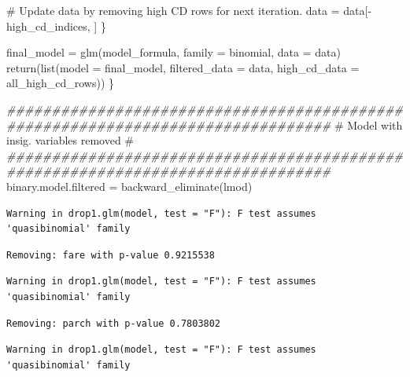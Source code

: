 \documentclass[
  letterpaper,
  DIV=11,
  numbers=noendperiod]{scrartcl}
\newenvironment{Shaded}{\begin{snugshade}}{\end{snugshade}}
\newcommand{\AttributeTok}[1]{\textcolor[rgb]{0.40,0.45,0.13}{#1}}
\newcommand{\CommentTok}[1]{\textcolor[rgb]{0.37,0.37,0.37}{#1}}
\newcommand{\DocumentationTok}[1]{\textcolor[rgb]{0.37,0.37,0.37}{\textit{#1}}}
\newcommand{\FunctionTok}[1]{\textcolor[rgb]{0.28,0.35,0.67}{#1}}
\newcommand{\NormalTok}[1]{\textcolor[rgb]{0.00,0.23,0.31}{#1}}
\newcommand{\OtherTok}[1]{\textcolor[rgb]{0.00,0.23,0.31}{#1}}
\newcommand{\SpecialCharTok}[1]{\textcolor[rgb]{0.37,0.37,0.37}{#1}}
\begin{document}
\begin{Shaded}
\begin{Highlighting}[]
    \CommentTok{\# Update data by removing high CD rows for next iteration.}
\NormalTok{    data }\OtherTok{=}\NormalTok{ data[}\SpecialCharTok{{-}}\NormalTok{high\_cd\_indices, ]}
\NormalTok{  \}}
  
\NormalTok{  final\_model }\OtherTok{=} \FunctionTok{glm}\NormalTok{(model\_formula, }\AttributeTok{family =}\NormalTok{ binomial, }\AttributeTok{data =}\NormalTok{ data)}
  \FunctionTok{return}\NormalTok{(}\FunctionTok{list}\NormalTok{(}\AttributeTok{model =}\NormalTok{ final\_model, }\AttributeTok{filtered\_data =}\NormalTok{ data, }\AttributeTok{high\_cd\_data =}\NormalTok{ all\_high\_cd\_rows))}
\NormalTok{\}}
\end{Highlighting}
\end{Shaded}

\begin{Shaded}
\begin{Highlighting}[]
\DocumentationTok{\#\#\#\#\#\#\#\#\#\#\#\#\#\#\#\#\#\#\#\#\#\#\#\#\#\#\#\#\#\#\#\#\#\#\#\#\#\#\#\#\#\#\#\#\#\#\#\#\#\#\#\#\#\#\#\#\#\#\#\#\#\#\#\#\#\#\#\#\#\#\#\#\#\#\#\#\#\#\#\#}
\CommentTok{\#                    Model with insig. variables removed                      \# }
\DocumentationTok{\#\#\#\#\#\#\#\#\#\#\#\#\#\#\#\#\#\#\#\#\#\#\#\#\#\#\#\#\#\#\#\#\#\#\#\#\#\#\#\#\#\#\#\#\#\#\#\#\#\#\#\#\#\#\#\#\#\#\#\#\#\#\#\#\#\#\#\#\#\#\#\#\#\#\#\#\#\#\#\#}
\NormalTok{binary.model.filtered }\OtherTok{=} \FunctionTok{backward\_eliminate}\NormalTok{(lmod)}
\end{Highlighting}
\end{Shaded}

\begin{verbatim}
Warning in drop1.glm(model, test = "F"): F test assumes 'quasibinomial' family
\end{verbatim}

\begin{verbatim}
Removing: fare with p-value 0.9215538 
\end{verbatim}

\begin{verbatim}
Warning in drop1.glm(model, test = "F"): F test assumes 'quasibinomial' family
\end{verbatim}

\begin{verbatim}
Removing: parch with p-value 0.7803802 
\end{verbatim}

\begin{verbatim}
Warning in drop1.glm(model, test = "F"): F test assumes 'quasibinomial' family
\end{verbatim}
\end{document}
